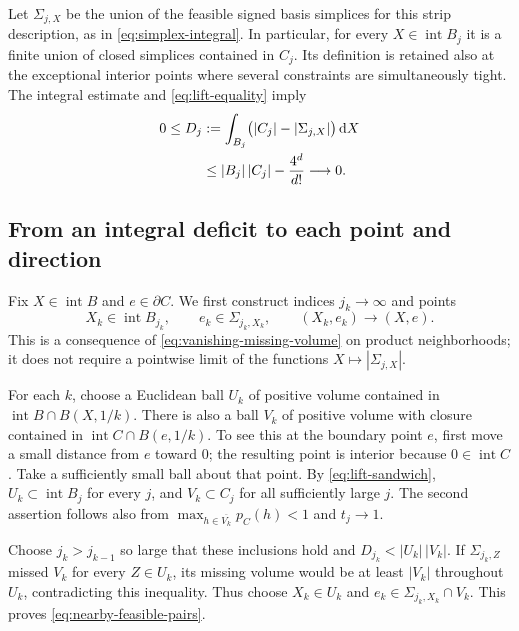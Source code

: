Let $\Sigma_{j,X}$ be the union of the feasible signed basis simplices for this strip description, as in \eqref{eq:simplex-integral}. In particular, for every $X\in\operatorname{int}B_j$ it is a finite union of closed simplices contained in $C_j$. Its definition is retained also at the exceptional interior points where several constraints are simultaneously tight. The integral estimate and \eqref{eq:lift-equality} imply
\begin{equation}\label{eq:vanishing-missing-volume}
 \begin{split}
 0\le D_j
 &:=\int_{B_j}\bigl(|C_j|-|\Sigma_{j,X}|\bigr)\,\mathrm{d} X\\
 &\le |B_j|\,|C_j|-\frac{4^d}{d!}
 \longrightarrow0.
 \end{split}
\end{equation}

\subsection{From an integral deficit to each point and direction}

Fix $X\in\operatorname{int}B$ and $e\in\partial C$. We first construct indices $j_k\to\infty$ and points
\begin{equation}\label{eq:nearby-feasible-pairs}
 X_k\in\operatorname{int}B_{j_k},\qquad
 e_k\in\Sigma_{j_k,X_k},\qquad
 (X_k,e_k)\longrightarrow(X,e).
\end{equation}
This is a consequence of \eqref{eq:vanishing-missing-volume} on product neighborhoods; it does not require a pointwise limit of the functions $X\mapsto|\Sigma_{j,X}|$.

For each $k$, choose a Euclidean ball $U_k$ of positive volume contained in $\operatorname{int}B\cap B(X,1/k)$. There is also a ball $V_k$ of positive volume with closure contained in $\operatorname{int}C\cap B(e,1/k)$. To see this at the boundary point $e$, first move a small distance from $e$ toward $0$; the resulting point is interior because $0\in\operatorname{int}C$. Take a sufficiently small ball about that point. By \eqref{eq:lift-sandwich}, $U_k\subset\operatorname{int}B_j$ for every $j$, and $V_k\subset C_j$ for all sufficiently large $j$. The second assertion follows also from $\max_{h\in\overline{V_k}}p_C(h)<1$ and $t_j\to1$.

Choose $j_k>j_{k-1}$ so large that these inclusions hold and $D_{j_k}<|U_k|\,|V_k|$. If $\Sigma_{j_k,Z}$ missed $V_k$ for every $Z\in U_k$, its missing volume would be at least $|V_k|$ throughout $U_k$, contradicting this inequality. Thus choose $X_k\in U_k$ and $e_k\in\Sigma_{j_k,X_k}\cap V_k$. This proves \eqref{eq:nearby-feasible-pairs}.

